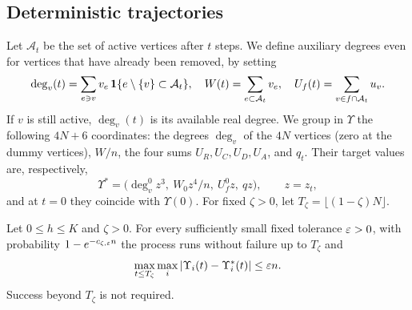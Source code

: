\subsection{Deterministic trajectories}

Let $\mathcal A_t$ be the set of active vertices after $t$ steps. We define auxiliary degrees even for
vertices that have already been
removed, by setting \[
 \deg_v(t)=\sum_{e\ni v}v_e\,\mathbf{1}\{e\setminus\{v\}\subset\mathcal A_t\},\quad
 W(t)=\sum_{e\subset\mathcal A_t}v_e,\quad U_f(t)=\sum_{v\in f\cap\mathcal A_t}u_v .
\] If $v$ is still active, $\deg_v(t)$ is its available real degree. We group in $\Upsilon$ the following
$4N+6$
coordinates: the degrees $\deg_v$ of the $4N$ vertices (zero at the dummy vertices), $W/n$, the four sums
$U_R,U_C,U_D,U_A$, and
$q_t$. Their target values are, respectively, \[
 \Upsilon^*=\bigl(\deg_v^0z^3,\ W_0z^4/n,\ U_f^0z,\ qz\bigr),\qquad z=z_t ,
\] and at $t=0$ they coincide with $\Upsilon(0)$. For fixed $\zeta>0$, let
$T_\zeta=\lfloor(1-\zeta)N\rfloor$.

\begin{lema}\label{lem:regularidad} Let $0\le h\le K$ and $\zeta>0$. For every
sufficiently small fixed tolerance
$\varepsilon>0$, with probability $1-e^{-c_{\zeta,\varepsilon}n}$ the process runs without failure up to $T_\zeta$ and
\begin{equation}\label{eq:regularidad}
 \max_{t\le T_\zeta}\max_i|\Upsilon_i(t)-\Upsilon_i^*(t)|\le\varepsilon n .
\end{equation} Success beyond $T_\zeta$ is not required. \end{lema}

